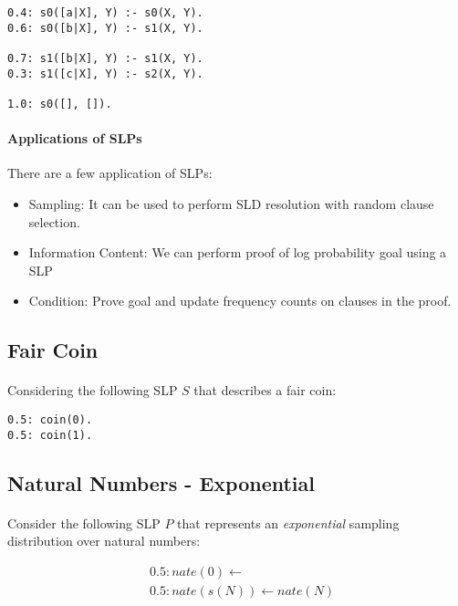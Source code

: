 \documentclass{article}
\theoremstyle{plain}
\theoremstyle{definition}
\begin{document}
\begin{multicols}{2}
\begin{lstlisting}
0.4: s0([a|X], Y) :- s0(X, Y).
0.6: s0([b|X], Y) :- s1(X, Y).

0.7: s1([b|X], Y) :- s1(X, Y).
0.3: s1([c|X], Y) :- s2(X, Y).

1.0: s0([], []).
\end{lstlisting}

\paragraph{Applications of SLPs} There are a few application of SLPs:

\begin{itemize}
\item Sampling: It can be used to perform SLD resolution with random clause selection.
\item Information Content: We can perform proof of log probability goal using a SLP
\item Condition: Prove goal and update frequency counts on clauses in the proof.
\end{itemize}

\subsection{Fair Coin}\label{sec:SLPFairCoin}

\paragraph{} Considering the following SLP $S$ that describes a fair coin:

\begin{lstlisting}
0.5: coin(0).
0.5: coin(1).
\end{lstlisting}%

\subsection{Natural Numbers - Exponential}

\paragraph{} Consider the following SLP $P$ that represents an \textit{exponential} sampling distribution over natural numbers:

\begin{align*}
&0.5: nate(0) \leftarrow\\
&0.5: nate(s(N)) \leftarrow nate(N)
\end{align*}


\end{multicols}
\end{document}
